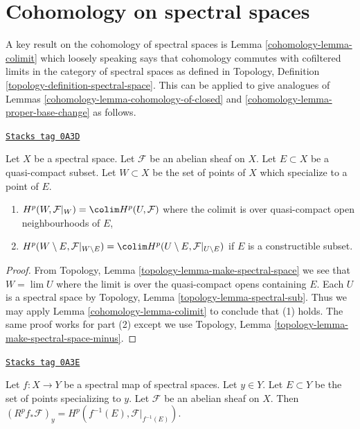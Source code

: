 \section{Cohomology on spectral spaces}
\label{cohomology-section-spectral}
A key result on the cohomology of spectral spaces is Lemma \ref{cohomology-lemma-colimit}
which loosely speaking says that cohomology commutes with cofiltered limits
in the category of spectral spaces as defined in
Topology, Definition \ref{topology-definition-spectral-space}.
This can be applied to give analogues of
Lemmas \ref{cohomology-lemma-cohomology-of-closed} and \ref{cohomology-lemma-proper-base-change}
as follows.

\begin{lemma}
\label{cohomology-lemma-cohomology-of-neighbourhoods-of-closed}
\href{https://stacks.math.columbia.edu/tag/0A3D}{\texttt{Stacks tag 0A3D}}

Let $X$ be a spectral space. Let $\mathcal{F}$ be an abelian sheaf on $X$.
Let $E \subset X$ be a quasi-compact subset. Let $W \subset X$ be the set of
points of $X$ which specialize to a point of $E$.
\begin{enumerate}
\item $H^p(W, \mathcal{F}|_W) = \colim H^p(U, \mathcal{F})$
where the colimit is over quasi-compact open neighbourhoods of $E$,
\item $H^p(W \setminus E, \mathcal{F}|_{W \setminus E}) =
\colim H^p(U \setminus E, \mathcal{F}|_{U \setminus E})$
if $E$ is a constructible subset.
\end{enumerate}
\end{lemma}

\begin{proof}

From Topology, Lemma \ref{topology-lemma-make-spectral-space}
we see that $W = \lim U$ where the limit is over the quasi-compact
opens containing $E$. Each $U$ is a spectral space by
Topology, Lemma \ref{topology-lemma-spectral-sub}.
Thus we may apply Lemma \ref{cohomology-lemma-colimit} to conclude that (1) holds.
The same proof works for part (2) except we use
Topology, Lemma \ref{topology-lemma-make-spectral-space-minus}.
\end{proof}

\begin{lemma}
\label{cohomology-lemma-proper-base-change-spectral}
\href{https://stacks.math.columbia.edu/tag/0A3E}{\texttt{Stacks tag 0A3E}}

Let $f : X \to Y$ be a spectral map of spectral spaces. Let $y \in Y$.
Let $E \subset Y$ be the set of points specializing to $y$.
Let $\mathcal{F}$ be an abelian sheaf on $X$.
Then $(R^pf_*\mathcal{F})_y = H^p(f^{-1}(E), \mathcal{F}|_{f^{-1}(E)})$.
\end{lemma}


